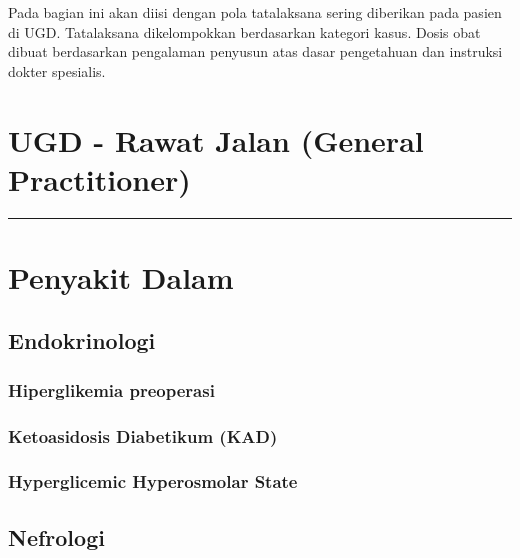 \documentclass[
]{book}
\begin{document}
Pada bagian ini akan diisi dengan pola tatalaksana sering diberikan pada pasien di UGD. Tatalaksana dikelompokkan berdasarkan kategori kasus. Dosis obat dibuat berdasarkan pengalaman penyusun atas dasar pengetahuan dan instruksi dokter spesialis.

\hypertarget{ugd---rawat-jalan-general-practitioner}{%
\section{UGD - Rawat Jalan (General Practitioner)}\label{ugd---rawat-jalan-general-practitioner}}

\begin{center}\rule{0.5\linewidth}{0.5pt}\end{center}

\hypertarget{penyakit-dalam-1}{%
\section{Penyakit Dalam}\label{penyakit-dalam-1}}

\hypertarget{endokrinologi}{%
\subsection{Endokrinologi}\label{endokrinologi}}

\hypertarget{hiperglikemia-preoperasi}{%
\subsubsection{Hiperglikemia preoperasi}\label{hiperglikemia-preoperasi}}

\hypertarget{ketoasidosis-diabetikum-kad}{%
\subsubsection{Ketoasidosis Diabetikum (KAD)}\label{ketoasidosis-diabetikum-kad}}

\hypertarget{hyperglicemic-hyperosmolar-state}{%
\subsubsection{Hyperglicemic Hyperosmolar State}\label{hyperglicemic-hyperosmolar-state}}

\hypertarget{nefrologi}{%
\subsection{Nefrologi}\label{nefrologi}}
\end{document}
